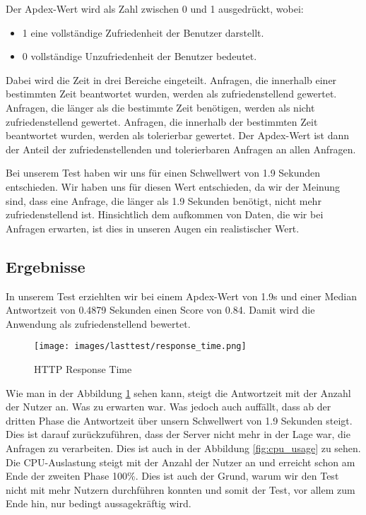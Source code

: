 \documentclass{qualitätssicherungsheft}
\begin{document}
Der Apdex-Wert wird als Zahl zwischen 0 und 1 ausgedrückt, wobei:
\begin{itemize}
    \item 1 eine vollständige Zufriedenheit der Benutzer darstellt.
    \item 0 vollständige Unzufriedenheit der Benutzer bedeutet.
\end{itemize}

Dabei wird die Zeit in drei Bereiche eingeteilt.
Anfragen, die innerhalb einer bestimmten Zeit beantwortet wurden, werden als zufriedenstellend gewertet.
Anfragen, die länger als die bestimmte Zeit benötigen, werden als nicht zufriedenstellend gewertet.
Anfragen, die innerhalb der bestimmten Zeit beantwortet wurden, werden als tolerierbar gewertet.
Der Apdex-Wert ist dann der Anteil der zufriedenstellenden und tolerierbaren Anfragen an allen Anfragen.

Bei unserem Test haben wir uns für einen Schwellwert von 1.9 Sekunden entschieden. Wir haben uns für diesen Wert entschieden, da wir der Meinung sind, dass eine Anfrage, die länger als 1.9 Sekunden benötigt, nicht mehr zufriedenstellend ist. Hinsichtlich dem aufkommen von Daten, die wir bei Anfragen erwarten, ist dies in unseren Augen ein realistischer Wert.

\subsection{Ergebnisse}
In unserem Test erziehlten wir bei einem Apdex-Wert von 1.9s und einer Median Antwortzeit von 0.4879 Sekunden einen Score von 0.84. Damit wird die Anwendung als zufriedenstellend bewertet.

\begin{figure}[!htp]
    \centering
        \texttt{[image: images/lasttest/response\_time.png]}
        \caption[center]{HTTP Response Time}
        \label{fig:http_response_time}
\end{figure}

Wie man in der Abbildung \ref{fig:http_response_time} sehen kann, steigt die Antwortzeit mit der Anzahl der Nutzer an. Was zu erwarten war. Was jedoch auch auffällt, dass ab der dritten Phase die Antwortzeit über unsern Schwellwert von 1.9 Sekunden steigt. Dies ist darauf zurückzuführen, dass der Server nicht mehr in der Lage war, die Anfragen zu verarbeiten. Dies ist auch in der Abbildung \ref{fig:cpu_usage} zu sehen. Die CPU-Auslastung steigt mit der Anzahl der Nutzer an und erreicht schon am Ende der zweiten Phase 100\%. Dies ist auch der Grund, warum wir den Test nicht mit mehr Nutzern durchführen konnten und somit der Test, vor allem zum Ende hin, nur bedingt aussagekräftig wird.
\end{document}

